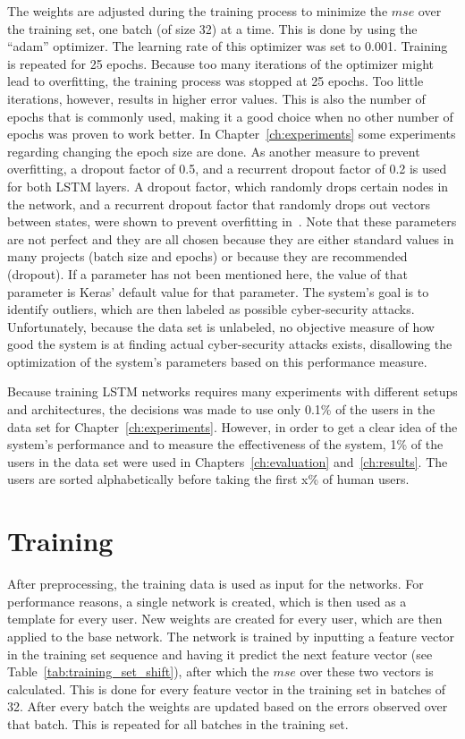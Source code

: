The weights are adjusted during the training process to minimize the \(mse\) over the training set, one batch (of size 32) at a time. This is done by using the \enquote{adam} optimizer. The learning rate of this optimizer was set to 0.001. Training is repeated for 25 epochs. Because too many iterations of the optimizer might lead to overfitting, the training process was stopped at 25 epochs. Too little iterations, however, results in higher error values. This is also the number of epochs that is commonly used, making it a good choice when no other number of epochs was proven to work better. In Chapter~\ref{ch:experiments} some experiments regarding changing the epoch size are done. As another measure to prevent overfitting, a dropout factor of 0.5, and a recurrent dropout factor of 0.2 is used for both LSTM layers. A dropout factor, which randomly drops certain nodes in the network, and a recurrent dropout factor that randomly drops out vectors between states, were shown to prevent overfitting in~\cite{srivastava2014dropout}. Note that these parameters are not perfect and they are all chosen because they are either standard values in many projects (batch size and epochs) or because they are recommended (dropout). If a parameter has not been mentioned here, the value of that parameter is Keras' default value for that parameter. The system's goal is to identify outliers, which are then labeled as possible cyber-security attacks. Unfortunately, because the data set is unlabeled, no objective measure of how good the system is at finding actual cyber-security attacks exists, disallowing the optimization of the system's parameters based on this performance measure.

Because training LSTM networks requires many experiments with different setups and architectures, the decisions was made to use only 0.1\% of the users in the data set for Chapter~\ref{ch:experiments}. However, in order to get a clear idea of the system's performance and to measure the effectiveness of the system, 1\% of the users in the data set were used in Chapters~\ref{ch:evaluation} and~\ref{ch:results}. The users are sorted alphabetically before taking the first x\% of human users.

\section{Training}
After preprocessing, the training data is used as input for the networks. For performance reasons, a single network is created, which is then used as a template for every user. New weights are created for every user, which are then applied to the base network. The network is trained by inputting a feature vector in the training set sequence and having it predict the next feature vector (see Table~\ref{tab:training_set_shift}), after which the \(mse\) over these two vectors is calculated. This is done for every feature vector in the training set in batches of 32. After every batch the weights are updated based on the errors observed over that batch. This is repeated for all batches in the training set.

